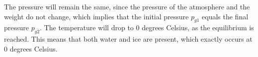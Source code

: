 The pressure will remain the same, since the pressure of the atmosphere and the weight do not change, which implies that the initial pressure \( p_{g1} \) equals the final pressure \( p_{g2} \). The temperature will drop to 0 degrees Celsius, as the equilibrium is reached. This means that both water and ice are present, which exactly occurs at 0 degrees Celsius.